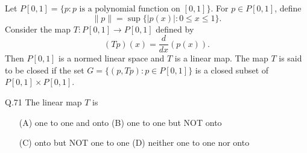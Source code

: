 \documentclass{article}
\begin{document}
																																																																																																													       Let $P[0,1] = \{p : p \text{ is a polynomial function on } [0,1]\}$. For $p \in P[0,1]$, define
																																																																																																													       \[
																																																																																																													       \|p\| = \sup \{|p(x)| : 0 \leq x \leq 1\}.
																																																																																																													       \]
																																																																																																													       Consider the map $T : P[0,1] \rightarrow P[0,1]$ defined by
																																																																																																													       \[
																																																																																																													       (Tp)(x) = \frac{d}{dx} \left(p(x)\right).
																																																																																																													       \]
																																																																																																													       Then $P[0,1]$ is a normed linear space and $T$ is a linear map. The map $T$ is said to be closed if the set $G = \{(p, Tp) : p \in P[0,1]\}$ is a closed subset of $P[0,1] \times P[0,1]$.

																																																																																																													       \bigskip

																																																																																																													       Q.71 \quad The linear map $T$ is
																																																																																																													       \begin{itemize}
																																																																																																													           \item[(A)] one to one and onto \hspace{6cm} (B) one to one but NOT onto
																																																																																																														       
																																																																																																														           \item[(C)] onto but NOT one to one \hspace{5cm} (D) neither one to one nor onto
																																																																																																															       
																																																																																																															       \end{itemize}
\end{document}
